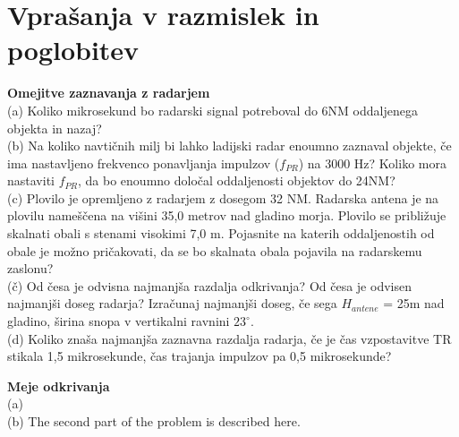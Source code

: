 \section*{Vprašanja v razmislek in poglobitev}
%
\begin{prob}
\label{prob1.ZaznavanjeRadarja}
\textbf{Omejitve zaznavanja z radarjem}\\
(a) Koliko mikrosekund bo radarski signal potreboval do 6NM oddaljenega objekta in nazaj?\\
(b) Na koliko navtičnih milj bi lahko ladijski radar enoumno zaznaval objekte, če ima nastavljeno frekvenco ponavljanja impulzov ($f_{PR}$) na 3000 Hz? Koliko mora nastaviti  $f_{PR}$, da bo enoumno določal oddaljenosti objektov do 24NM? \\
(c) Plovilo je opremljeno z radarjem z dosegom 32 NM.  Radarska antena je na plovilu nameščena na višini 35,0 metrov nad gladino morja. Plovilo se približuje skalnati obali s stenami visokimi 7,0 m. Pojasnite na katerih oddaljenostih od obale je možno pričakovati, da se bo skalnata obala pojavila na radarskemu zaslonu? \\
(č) Od česa je odvisna najmanjša razdalja odkrivanja? Od česa je odvisen najmanjši doseg radarja? Izračunaj najmanjši doseg, če sega $H_{antene}$ = 25m nad gladino, širina snopa v vertikalni ravnini $23^{\circ}$.\\
(d) Koliko znaša najmanjša zaznavna razdalja radarja, če je čas vzpostavitve TR stikala 1,5 mikrosekunde, čas trajanja impulzov pa 0,5 mikrosekunde?
\end{prob}

\begin{prob}
\label{prob2.Odkrivanje}
\textbf{Meje odkrivanja}\\
(a) \\
(b) The second part of the problem is described here.
\end{prob}



%
